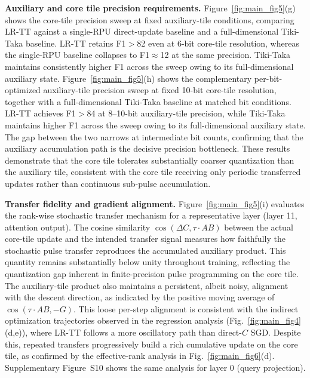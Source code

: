 \documentclass[AMA,LATO2COL]{WileyNJDv5}
\begin{document}
\noindent
\textbf{Auxiliary and core tile precision requirements.}
Figure~\ref{fig:main_fig5}(g) shows the core-tile precision sweep at fixed auxiliary-tile conditions, comparing LR-TT against a single-RPU direct-update baseline and a full-dimensional Tiki-Taka baseline. LR-TT retains F1\(>\)82 even at 6-bit core-tile resolution, whereas the single-RPU baseline collapses to F1\(\approx\)12 at the same precision. Tiki-Taka maintains consistently higher F1 across the sweep owing to its full-dimensional auxiliary state. Figure~\ref{fig:main_fig5}(h) shows the complementary per-bit-optimized auxiliary-tile precision sweep at fixed 10-bit core-tile resolution, together with a full-dimensional Tiki-Taka baseline at matched bit conditions. LR-TT achieves F1\(>\)84 at 8--10-bit auxiliary-tile precision, while Tiki-Taka maintains higher F1 across the sweep owing to its full-dimensional auxiliary state. The gap between the two narrows at intermediate bit counts, confirming that the auxiliary accumulation path is the decisive precision bottleneck. These results demonstrate that the core tile tolerates substantially coarser quantization than the auxiliary tile, consistent with the core tile receiving only periodic transferred updates rather than continuous sub-pulse accumulation.

\noindent
\textbf{Transfer fidelity and gradient alignment.}
Figure~\ref{fig:main_fig5}(i) evaluates the rank-wise stochastic transfer mechanism for a representative layer (layer 11, attention output). The cosine similarity \(\cos(\Delta C, \tau\cdot AB)\) between the actual core-tile update and the intended transfer signal measures how faithfully the stochastic pulse transfer reproduces the accumulated auxiliary product. This quantity remains substantially below unity throughout training, reflecting the quantization gap inherent in finite-precision pulse programming on the core tile. The auxiliary-tile product also maintains a persistent, albeit noisy, alignment with the descent direction, as indicated by the positive moving average of \(\cos(\tau\cdot AB, -G)\). This loose per-step alignment is consistent with the indirect optimization trajectories observed in the regression analysis (Fig.~\ref{fig:main_fig4}(d,e)), where LR-TT follows a more oscillatory path than direct-\(C\) SGD. Despite this, repeated transfers progressively build a rich cumulative update on the core tile, as confirmed by the effective-rank analysis in Fig.~\ref{fig:main_fig6}(d). Supplementary Figure~S10 shows the same analysis for layer 0 (query projection).
\end{document}
